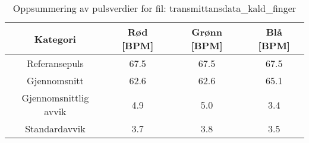 
\begin{table}[H]
\centering
\caption{Oppsummering av pulsverdier for fil: transmittansdata\_kald\_finger}
\label{tab:transmittansdata\_kald\_finger\_summary}
\begin{tabular}{|c|c|c|c|}
\hline
\textbf{Kategori} & \textbf{Rød [BPM]} & \textbf{Grønn [BPM]} & \textbf{Blå [BPM]} \\ \hline
Referansepuls & 67.5 & 67.5 & 67.5 \\ \hline
Gjennomsnitt & 62.6 & 62.6 & 65.1 \\ \hline
Gjennomsnittlig avvik & 4.9 & 5.0 & 3.4 \\ \hline
Standardavvik & 3.7 & 3.8 & 3.5 \\ \hline
\end{tabular}
\end{table}

